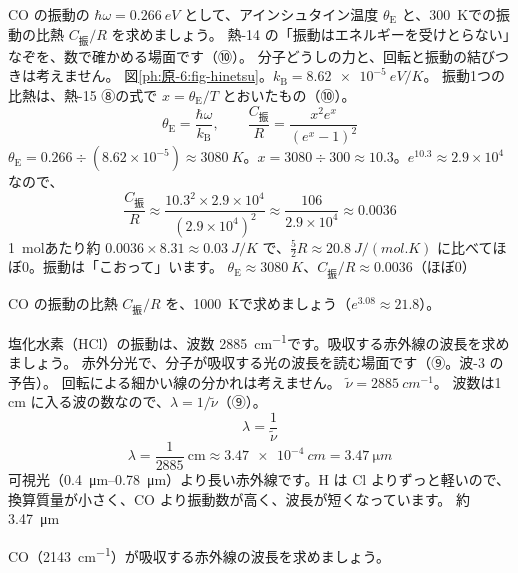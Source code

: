 \label{ph:原-6:ex8}
\begin{phreidai}
CO の振動の $\hbar\omega=\qty{0.266}{eV}$ として、アインシュタイン温度 $\theta_{\mathrm E}$ と、\qty{300}{K}での振動の比熱 $C_{\text{振}}/R$ を求めましょう。
\phbamen
熱-14 の「振動はエネルギーを受けとらない」なぞを、数で確かめる場面です（⑩）。
\phmushi
分子どうしの力と、回転と振動の結びつきは考えません。
\phzu
図\ref{ph:原-6:fig-hinetsu}。$k_{\mathrm B}=\qty{8.62e-5}{eV/K}$。
\phriyu
振動1つの比熱は、熱-15 ⑧の式で $x=\theta_{\mathrm E}/T$ とおいたもの（⑩）。
\phtateru
\[\theta_{\mathrm E}=\frac{\hbar\omega}{k_{\mathrm B}},\qquad \frac{C_{\text{振}}}{R}=\frac{x^2e^x}{(e^x-1)^2}\]
\phtoku
$\theta_{\mathrm E}=0.266\div(8.62\times10^{-5})\approx\qty{3080}{K}$。$x=3080\div300\approx10.3$。$e^{10.3}\approx2.9\times10^4$ なので、
\[\frac{C_{\text{振}}}{R}\approx\frac{10.3^2\times2.9\times10^4}{(2.9\times10^4)^2}\approx\frac{106}{2.9\times10^4}\approx0.0036\]
\phtashikame
\qty{1}{mol}あたり約 $0.0036\times8.31\approx\qty{0.03}{J/K}$ で、$\tfrac52R\approx\qty{20.8}{J/(mol.K)}$ に比べてほぼ0。振動は「こおって」います。
\kotae $\theta_{\mathrm E}\approx\qty{3080}{K}$、$C_{\text{振}}/R\approx0.0036$（ほぼ0）
\end{phreidai}
\begin{jibun}
CO の振動の比熱 $C_{\text{振}}/R$ を、\qty{1000}{K}で求めましょう（$e^{3.08}\approx21.8$）。
\end{jibun}

\label{ph:原-6:ex9}
\begin{phreidai}
塩化水素（HCl）の振動は、波数 \qty{2885}{cm^{-1}}です。吸収する赤外線の波長を求めましょう。
\phbamen
赤外分光で、分子が吸収する光の波長を読む場面です（⑨。波-3 の予告）。
\phmushi
回転による細かい線の分かれは考えません。
\phzu
$\tilde\nu=\qty{2885}{cm^{-1}}$。
\phriyu
波数は1 cm に入る波の数なので、$\lambda=1/\tilde\nu$（⑨）。
\phtateru
\[\lambda=\frac{1}{\tilde\nu}\]
\phtoku
\[\lambda=\frac{1}{2885}\ \text{cm}\approx\qty{3.47e-4}{cm}=\qty{3.47}{\micro m}\]
\phtashikame
可視光（\qtyrange{0.4}{0.78}{\micro m}）より長い赤外線です。H は Cl よりずっと軽いので、換算質量が小さく、CO より振動数が高く、波長が短くなっています。
\kotae 約 \qty{3.47}{\micro m}
\end{phreidai}
\begin{jibun}
CO（\qty{2143}{cm^{-1}}）が吸収する赤外線の波長を求めましょう。
\end{jibun}

